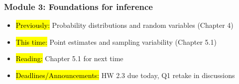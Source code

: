 
\begin{frame}
    \frametitle{Module 3: Foundations for inference}
    \begin{itemize}
        \item \hl{Previously: }Probability distributions and random variables (Chapter 4)
        \item \hl{This time: }Point estimates and sampling variability (Chapter 5.1)
        \item \hl{Reading: }Chapter 5.1 for next time
        \item \hl{Deadlines/Announcements: }HW 2.3 due today, Q1 retake in discussions
    \end{itemize}
    
\end{frame}
    